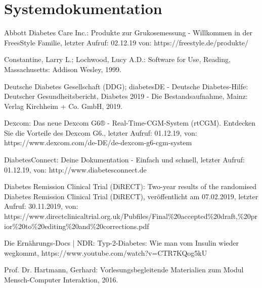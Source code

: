 \documentclass[a4paper,11pt]{article}%
\renewcommand{\\}{\vspace*{0.5\baselineskip} \newline}
\begin{document}
	\section{Systemdokumentation}
	
	\newpage
	
	
	
	\newpage
	
	\begin{thebibliography}{1}
		
		Abbott Diabetes Care Inc.:
		Produkte zur Grukosemessung - Willkommen in der FreesStyle Familie, letzter Aufruf: 02.12.19 von:
		https://freestyle.de/produkte/	
		
		Constantine, Larry L.; Lochwood, Lucy A.D.: 
		Software for Use, 
		Reading, Massachusetts: Addison Wesley,
		1999.
		
		Deutsche Diabetes Gesellschaft (DDG); diabetesDE - Deutsche Diabetes-Hilfe:
		Deutscher Gesundheitsbericht, Diabetes 2019 - Die Bestandsaufnahme, 
		Mainz: Verlag Kirchheim + Co. GmbH,
		2019.
		
		Dexcom:
		Das neue Dexcom G6® - Real-Time-CGM-System (rtCGM). Entdecken Sie die Vorteile des Dexcom G6., letzter Aufruf: 01.12.19, von: https://www.dexcom.com/de-DE/de-dexcom-g6-cgm-system
		
		DiabetesConnect:
		Deine Dokumentation - Einfach und schnell, letzter Aufruf: 01.12.19, von: http://www.diabetesconnect.de
		
		Diabetes Remission Clinical Trial (DiRECT):
		Two-year results of the randomised Diabetes Remission Clinical Trial (DiRECT), veröffentlicht am 07.02.2019, \newline
		letzter Aufruf: 30.11.2019, von: https://www.directclinicaltrial.org.uk/Pubfiles/Final\newline\%20accepted\%20draft,\%20prior\%20to\%20editing\%20and\%20corrections.pdf
		
		Die Ernährungs-Docs | NDR:
		Typ-2-Diabetes: Wie man vom Insulin wieder wegkommt, \newline
		https://www.youtube.com/watch?v=CTR7KQog5kU
		
		Prof. Dr. Hartmann, Gerhard: 
		Vorlesungsbegleitende Materialien zum Modul Mensch-Computer Interaktion, 
		2016.
		

\end{thebibliography}
\end{document}
